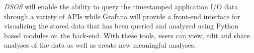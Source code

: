 
\emph{DSOS} will enable the ability to query the timestamped application I/O data through a variety of APIs while Grafana will provide a front-end interface for visualizing the stored data that has been queried and analyzed using Python based modules on the back-end. With these tools, users can view, edit and share analyses of the data as well as create new meaningful analyses. 


